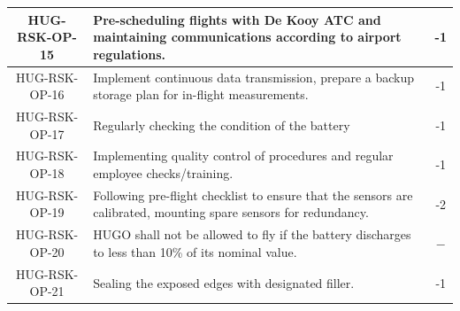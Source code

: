 \begin{longtable}{|c|p{12cm}|c|}
HUG-RSK-OP-15 & Pre-scheduling flights with De Kooy ATC and maintaining communications according to airport regulations.
& -1 \\ \hline

HUG-RSK-OP-16 & Implement continuous data transmission, prepare a backup storage plan for in-flight measurements.
& -1 \\ \hline

HUG-RSK-OP-17 & 
Regularly checking the condition of the battery
& -1 \\\hline

HUG-RSK-OP-18 & Implementing quality control of procedures and regular employee checks/training. & -1 \\\hline

HUG-RSK-OP-19 & Following pre-flight checklist to ensure that the sensors are calibrated, mounting spare sensors for redundancy. & -2 \\\hline

HUG-RSK-OP-20 & HUGO shall not be allowed to fly if the battery discharges to less than 10\% of its nominal value. & $-$ \\\hline

HUG-RSK-OP-21 & Sealing the exposed edges with designated filler. & -1 \\\hline

\end{longtable}









